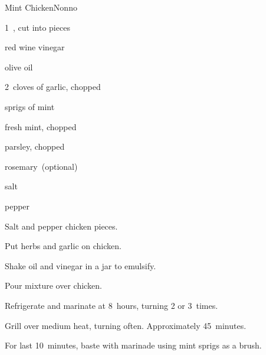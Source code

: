 \begin{recipe}{Mint Chicken}{Nonno}{}

\begin{ingredients}
\item 1~, cut into pieces
\item {} red wine vinegar
\item {} olive oil
\item 2~cloves of garlic, chopped
\item sprigs of mint
\item {} fresh mint, chopped
\item {} parsley, chopped
\item {} rosemary~(optional)
\item salt
\item pepper
\end{ingredients}

\begin{directions}
\item Salt and pepper chicken pieces.
\item Put herbs and garlic on chicken.
\item Shake oil and vinegar in a jar to emulsify.
\item Pour mixture over chicken.
\item Refrigerate and marinate at 8~hours, turning 2 or 3~times.
\item Grill over medium heat, turning often. Approximately 45~minutes.
\item For last 10~minutes, baste with marinade using mint sprigs as a brush.
\end{directions}

\end{recipe}
